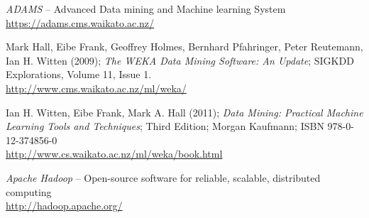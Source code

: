 %

\begin{thebibliography}{999}

		\textit{ADAMS} -- Advanced Data mining and Machine learning System \\
		\url{https://adams.cms.waikato.ac.nz/}{}

	 	Mark Hall, Eibe Frank, Geoffrey Holmes, Bernhard Pfahringer, Peter
	 	Reutemann, Ian H. Witten (2009); \textit{The WEKA Data Mining Software: An
	 	Update}; SIGKDD Explorations, Volume 11, Issue 1. \\
		\url{http://www.cms.waikato.ac.nz/ml/weka/}{}

		Ian H. Witten, Eibe Frank, Mark A. Hall (2011); \textit{Data Mining: Practical
		Machine Learning Tools and Techniques}; Third Edition; Morgan Kaufmann; ISBN
		978-0-12-374856-0 \\
		\url{http://www.cs.waikato.ac.nz/ml/weka/book.html}{}

	 	\textit{Apache Hadoop} -- Open-source software for reliable, scalable,
	 	distributed computing \\
		\url{http://hadoop.apache.org/}{}

\end{thebibliography}

